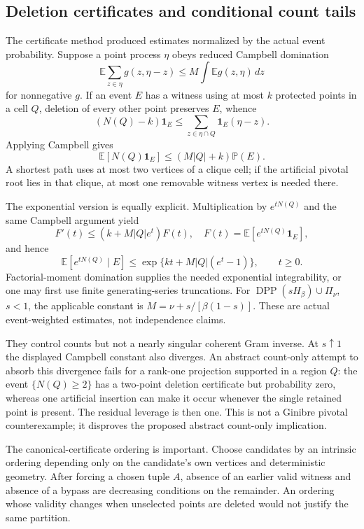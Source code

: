 \documentclass[11pt,a4paper]{article}
\theoremstyle{definition}
\theoremstyle{remark}
\numberwithin{equation}{section}
\begin{document}
\subsection{Deletion certificates and conditional count tails}
\label{br:counts}

The certificate method produced estimates normalized by the actual
event probability.  Suppose a point process $\eta$ obeys reduced
Campbell domination
\[
 \mathbb E\sum_{z\in\eta}g(z,\eta-z)
 \leq M\int\mathbb Eg(z,\eta)\,dz
\]
for nonnegative $g$.  If an event $E$ has a witness using at most $k$
protected points in a cell $Q$, deletion of every other point preserves
$E$, whence
\[
 (N(Q)-k)\mathbf1_E\leq
 \sum_{z\in\eta\cap Q}\mathbf1_E(\eta-z).
\]
Applying Campbell gives
\begin{equation}
 \mathbb E[N(Q)\mathbf1_E]\leq(M|Q|+k)\mathbb P(E).
 \label{br:count-mean}
\end{equation}
A shortest path uses at most two vertices of a clique cell; if the
artificial pivotal root lies in that clique, at most one removable
witness vertex is needed there.

The exponential version is equally explicit.  Multiplication by
$e^{tN(Q)}$ and the same Campbell argument yield
\[
 F'(t)\leq(k+M|Q|e^t)F(t),
 \quad F(t)=\mathbb E[e^{tN(Q)}\mathbf1_E],
\]
and hence
\begin{equation}
 \mathbb E[e^{tN(Q)}\mid E]
 \leq\exp\{kt+M|Q|(e^t-1)\},\qquad t\geq0.
 \label{br:count-mgf}
\end{equation}
Factorial-moment domination supplies the needed exponential
integrability, or one may first use finite generating-series
truncations.  For
$\operatorname{DPP}(sH_\beta)\cup\Pi_\nu$, $s<1$, the applicable
constant is $M=\nu+s/[\beta(1-s)]$.
These are actual event-weighted estimates, not independence claims.

They control counts but not a nearly singular coherent Gram inverse.
At $s\uparrow1$ the displayed Campbell constant also diverges.  An
abstract count-only attempt to absorb this divergence fails for a
rank-one projection supported in a region $Q$: the event
$\{N(Q)\geq2\}$ has a two-point deletion certificate but probability
zero, whereas one artificial insertion can make it occur whenever the
single retained point is present.  The residual leverage is then one.
This is not a Ginibre pivotal counterexample; it disproves the proposed
abstract count-only implication.

The canonical-certificate ordering is important.  Choose candidates by
an intrinsic ordering depending only on the candidate's own vertices
and deterministic geometry.  After forcing a chosen tuple $A$, absence
of an earlier valid witness and absence of a bypass are decreasing
conditions on the remainder.  An ordering whose validity changes when
unselected points are deleted would not justify the same partition.
\end{document}
